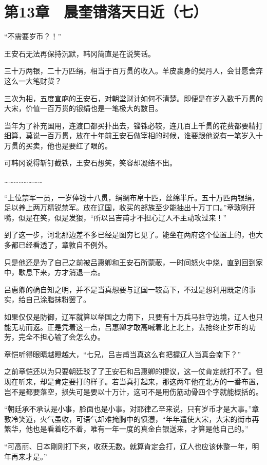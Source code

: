 \section{第13章　晨奎错落天日近（七）}

“不需要岁币？！”

王安石无法再保持沉默，韩冈简直是在说笑话。

三十万两银，二十万匹绢，相当于百万贯的收入。羊皮裹身的契丹人，会甘愿舍弃这么一大笔财货？

三次为相，五度宣麻的王安石，对朝堂财计如何不清楚。即便是在岁入数千万贯的大宋，价值一百万贯的银绢也是一笔极大的数目。

当年为了补充国用，连渡口都买扑出去，锱铢必较，连几百上千贯的花费都要精打细算，莫说一百万贯，放在十年前王安石做宰相的时候，谁要跟他说有一笔岁入十万贯的买卖，他也是要红了眼的。

可韩冈说得斩钉截铁，王安石想笑，笑容却凝结不出。

……………………

“上位禁军一员，一岁俸钱十八贯，绢绸布帛十匹，丝绵半斤。五十万匹两银绢，足以养上两万精锐禁军。放在辽国，收买的部族至少能抽出十万丁口。”章敦咧开嘴，似是在笑，似是发狠，“所以吕吉甫才不担心辽人不主动攻过来！”

到了这一步，河北那边差不多已经是图穷匕见了。能坐在两府这个位置上的，也大多都已经看透了，章敦自不例外。

只是他还是为了自己之前被吕惠卿和王安石所蒙蔽，一时间怒火中烧，直到回到家中，歇息下来，方才消退一点。

吕惠卿的确自知之明，并不是当真想要与辽国一较高下，不过是想利用既定的事实，给自己涂脂抹粉罢了。

如果仅仅是防御，辽军就算以举国之力南下，只要有十万兵马驻守边境，辽人也只能无功而返。正是凭着这一点，吕惠卿才敢高喊着北上北上，去抢终止岁币的功劳，完全不担心输了会怎么办。

章恺听得眼睛越瞪越大，“七兄，吕吉甫当真这么有把握辽人当真会南下？”

之前章恺还以为只要朝廷驳了了王安石和吕惠卿的提议，这一仗肯定就打不了。但现在听来，却是肯定要打的样子。若当真打起来，那这两年他在北方的一番布置，岂不是都要落空，损失可是要以十万计，这可不是用伤筋动骨四个字就能概括的。

“朝廷承不承认是小事，脸面也是小事。对耶律乙辛来说，只有岁币才是大事。”章敦冷笑道，火气虽收，可语气却难掩胸中的愤懑，“年年遣使大宋，大宋的街市再繁华，他也是看着吃不着，唯有一年一度的真金白银送来，才算是他自己的。”

“可高丽、日本刚刚打下来，收获无数。就算肯定会打，辽人也应该休整一年，明年再来才是。”


